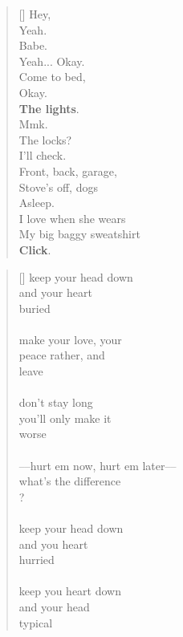 \documentclass{article}
\begin{document}
\newpage
{}
\settowidth{\versewidth}{Than Tycho Brahe, or Erra Pater:}
\begin{verse}[\versewidth]
Hey, \\
Yeah. \\
Babe. \\
Yeah... Okay. \\
Come to bed, \\
Okay. \\
\textbf{The lights}. \\
Mmk. \\
The locks? \\
I'll check. \\
Front, back, garage, \\
Stove's off, dogs \\
Asleep. \\
\tab I love when she wears \\
\tab My big baggy sweatshirt \\
\textbf{Click}. \\
\end{verse}

\settowidth{\versewidth}{Than Tycho Brahe, or Erra Pater:}
\begin{verse}[\versewidth]
keep your head down \\
and your heart \\
buried \\
\\
make your love, your \\
peace rather, and \\
leave \\
\\
don't stay long \\
you'll only make it \\
worse \\
\\
––hurt em now, hurt em later–– \\
what's the difference \\
? \\
\\
keep your head down \\ 
and you heart \\
hurried \\
\\
keep you heart down \\
and your head \\
typical \\
\end{verse}
\end{document}
